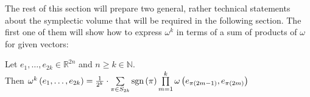 \documentclass[../SymplecticSimplices.tex]{subfiles}
\begin{document}
The rest of this section will prepare two general, rather technical statements about the symplectic volume that will be required in the following section. The first one of them will show how to express \( \omega^k \) in terms of a sum of products of \( \omega \) for given vectors:

\begin{lemma}
  \label{lemma:splitomegatothepowerofk}
  Let \( e_1, \dots, e_{2k} \in \mathbb{R}^{2n} \) and \( n \geq k \in \mathbb{N} \).\\
  Then \( \omega^k \left( e_{1}, \dots, e_{2k} \right) = \frac{1}{2^k} \cdot \sum \limits_{\pi \in S_{2k}} \textnormal{sgn} \left( \pi \right) \prod \limits_{m = 1}^{k} \omega \left(e_{\pi \left( 2m-1 \right)}, e_{\pi \left( 2m \right)} \right) \)
\end{lemma}
\end{document}
